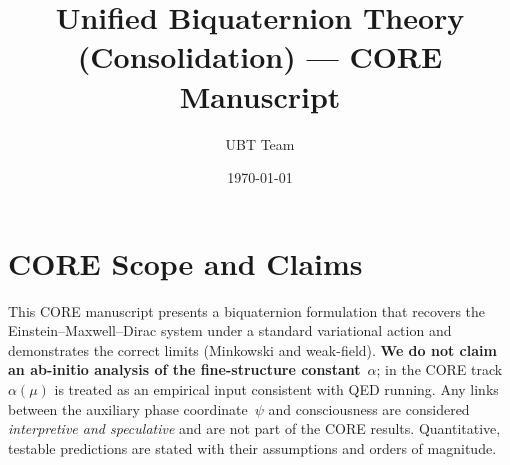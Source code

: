 \documentclass[11pt,a4paper]{article}
\title{Unified Biquaternion Theory (Consolidation) --- CORE Manuscript}
\author{UBT Team}
\date{\today}
\begin{document}
\maketitle
\tableofcontents

\section*{CORE Scope and Claims}
This CORE manuscript presents a biquaternion formulation that recovers the Einstein--Maxwell--Dirac system under a standard variational action and demonstrates the correct limits (Minkowski and weak-field). \textbf{We do not claim an ab-initio analysis of the fine-structure constant}~$\alpha$; in the CORE track $\alpha(\mu)$ is treated as an empirical input consistent with QED running. Any links between the auxiliary phase coordinate~$\psi$ and consciousness are considered \emph{interpretive and speculative} and are not part of the CORE results. Quantitative, testable predictions are stated with their assumptions and orders of magnitude.











\end{document}

